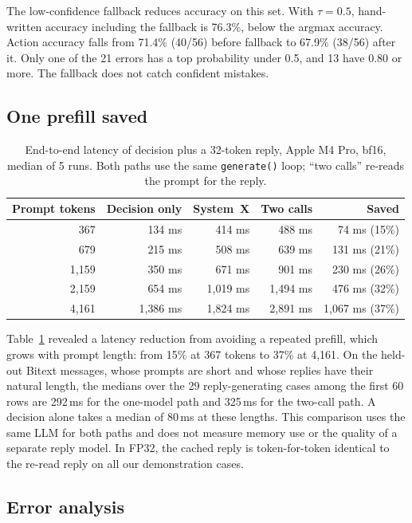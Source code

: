 \documentclass[11pt]{article}
\begin{document}
The low-confidence fallback reduces accuracy on this set. With $\tau=0.5$, hand-written accuracy including the fallback is 76.3\%, below the argmax accuracy. Action accuracy falls from 71.4\% (40/56) before fallback to 67.9\% (38/56) after it. Only one of the 21 errors has a top probability under 0.5, and 13 have 0.80 or more. The fallback does not catch confident mistakes.

\subsection{One prefill saved}

\begin{table}[t]
\centering
\caption{End-to-end latency of decision plus a 32-token reply, Apple M4 Pro, bf16, median of 5 runs. Both paths use the same \texttt{generate()} loop; ``two calls'' re-reads the prompt for the reply.}
\label{tab:latency}
\small
\begin{tabular}{rrrrr}
\toprule
Prompt tokens & Decision only & System~X & Two calls & Saved \\
\midrule
367   & 134 ms   & 414 ms   & 488 ms   & 74 ms (15\%) \\
679   & 215 ms   & 508 ms   & 639 ms   & 131 ms (21\%) \\
1{,}159 & 350 ms & 671 ms   & 901 ms   & 230 ms (26\%) \\
2{,}159 & 654 ms & 1{,}019 ms & 1{,}494 ms & 476 ms (32\%) \\
4{,}161 & 1{,}386 ms & 1{,}824 ms & 2{,}891 ms & 1{,}067 ms (37\%) \\
\bottomrule
\end{tabular}
\end{table}

Table~\ref{tab:latency} revealed a latency reduction from avoiding a repeated prefill, which grows with prompt length: from 15\% at 367 tokens to 37\% at 4{,}161. On the held-out Bitext messages, whose prompts are short and whose replies have their natural length, the medians over the 29 reply-generating cases among the first 60 rows are 292\,ms for the one-model path and 325\,ms for the two-call path. A decision alone takes a median of 80\,ms at these lengths. This comparison uses the same LLM for both paths and does not measure memory use or the quality of a separate reply model. In FP32, the cached reply is token-for-token identical to the re-read reply on all our demonstration cases.

\subsection{Error analysis}\label{sec:errors}
\end{document}
